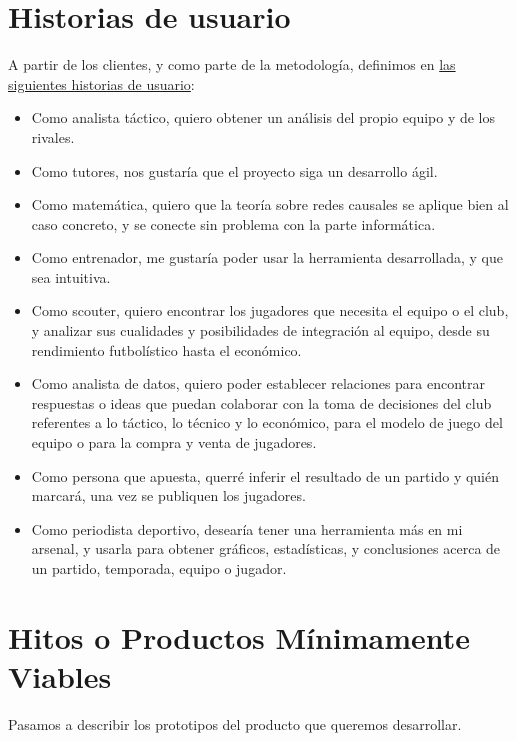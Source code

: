 \section{Historias de usuario}  

A partir de los clientes, y como parte de la metodología, definimos en \href{https://github.com/ElenaMerelo/TFG/issues?q=is%3Aopen+is%3Aissue+label%3Auser-story}{las siguientes historias de usuario}: 

\begin{itemize}
    \item Como analista táctico, quiero obtener un análisis del propio equipo y de los rivales.
    \item Como tutores, nos gustaría que el proyecto siga un desarrollo ágil.
    \item Como matemática, quiero que la teoría sobre redes causales se aplique bien al caso concreto, y se conecte sin problema con la parte informática.
    \item Como entrenador, me gustaría poder usar la herramienta desarrollada, y que sea intuitiva.
    \item Como scouter,  quiero encontrar los jugadores que necesita el equipo 
    o el club, y analizar sus cualidades y posibilidades de integración al equipo, desde su rendimiento futbolístico hasta el 
    económico.
    \item Como analista de datos, quiero poder establecer relaciones para encontrar respuestas o ideas que 
    puedan colaborar con la toma de decisiones del club referentes 
    a lo táctico, lo técnico y lo económico, para el modelo de 
    juego del equipo o para la compra y venta de jugadores. 
    \item Como persona que apuesta, querré inferir el resultado de un partido y 
    quién marcará, una vez se publiquen los jugadores. 
    \item Como periodista deportivo, desearía tener una herramienta más en mi arsenal, y 
    usarla para obtener gráficos, estadísticas, y conclusiones acerca de un partido, 
    temporada, equipo o jugador.
\end{itemize}

\section{Hitos o Productos Mínimamente Viables}
Pasamos a describir los prototipos del producto que queremos desarrollar.


